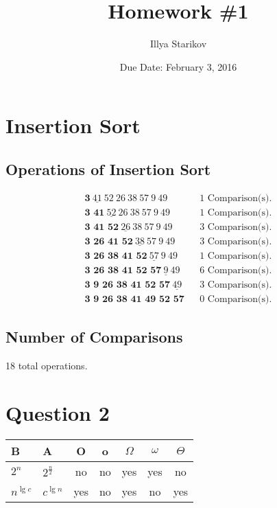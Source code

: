 \documentclass{article}
\begin{document}
\author{Illya Starikov}
\title{Homework \#1}
\date{Due Date: February 3, 2016}
\maketitle

\section{Insertion Sort}
\subsection{Operations of Insertion Sort}
\begin{eqnarray*}
\textbf{3} \ \underline{41} \ 52 \ 26 \ 38 \ 57 \ 9 \ 49  & & \text{1 Comparison(s).} \\
\textbf{3 41} \ \underline{52} \ 26 \ 38 \ 57 \ 9 \ 49  & & \text{1 Comparison(s).} \\
\textbf{3 41 52} \ \underline{26} \ 38 \ 57 \ 9 \ 49  & & \text{3 Comparison(s).} \\
\textbf{3 26 41 52} \ \underline{38} \ 57 \ 9 \ 49  & & \text{3 Comparison(s).} \\
\textbf{3 26 38 41 52} \ \underline{57} \ 9 \ 49  & & \text{1 Comparison(s).} \\
\textbf{3 26 38 41 52 57} \ \underline{9} \ 49  & & \text{6 Comparison(s).} \\
\textbf{3 9 26 38 41 52 57} \ \underline{49}  & & \text{3 Comparison(s).} \\
\textbf{3 9 26 38 41 49 52 57} & & \text{0 Comparison(s).}
\end{eqnarray*}

\subsection{Number of Comparisons}
18 total operations.

\section{Question 2}
\begin{center}
\begin{tabular}{| l | l | c | c | c | c | c |}
 \hline
B & A & O & o & $\Omega$ & $\omega$ & $\Theta$ \\ \hline
$2^n$ & $2^\frac{n}{2}$ & no & no & yes & yes & no \\ \hline
$n^{\lg c}$ & $c^{\lg n}$ & yes & no & yes & no & yes \\ \hline
\end{tabular}
\end{center}
\end{document}
